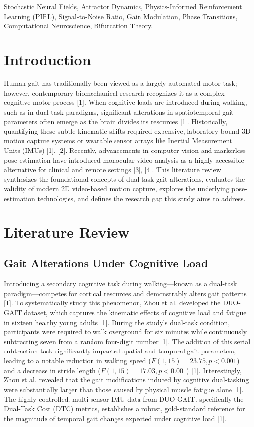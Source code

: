 \documentclass[conference]{IEEEtran}
\begin{document}
\begin{IEEEkeywords}
Stochastic Neural Fields, Attractor Dynamics, Physics-Informed Reinforcement Learning (PIRL), Signal-to-Noise Ratio, Gain Modulation, Phase Transitions, Computational Neuroscience, Bifurcation Theory.
\end{IEEEkeywords}

\section{Introduction}
Human gait has traditionally been viewed as a largely automated motor task; however, contemporary biomechanical research recognizes it as a complex cognitive-motor process [1]. When cognitive loads are introduced during walking, such as in dual-task paradigms, significant alterations in spatiotemporal gait parameters often emerge as the brain divides its resources [1]. Historically, quantifying these subtle kinematic shifts required expensive, laboratory-bound 3D motion capture systems or wearable sensor arrays like Inertial Measurement Units (IMUs) [1], [2]. Recently, advancements in computer vision and markerless pose estimation have introduced monocular video analysis as a highly accessible alternative for clinical and remote settings [3], [4]. This literature review synthesizes the foundational concepts of dual-task gait alterations, evaluates the validity of modern 2D video-based motion capture, explores the underlying pose-estimation technologies, and defines the research gap this study aims to address.

\section{Literature Review}
\subsection{Gait Alterations Under Cognitive Load}
Introducing a secondary cognitive task during walking—known as a dual-task paradigm—competes for cortical resources and demonstrably alters gait patterns [1]. To systematically study this phenomenon, Zhou et al. developed the DUO-GAIT dataset, which captures the kinematic effects of cognitive load and fatigue in sixteen healthy young adults [1]. During the study's dual-task condition, participants were required to walk overground for six minutes while continuously subtracting seven from a random four-digit number [1]. The addition of this serial subtraction task significantly impacted spatial and temporal gait parameters, leading to a notable reduction in walking speed ($F(1,15) = 23.75, p < 0.001$) and a decrease in stride length ($F(1,15) = 17.03, p < 0.001$) [1]. Interestingly, Zhou et al. revealed that the gait modifications induced by cognitive dual-tasking were substantially larger than those caused by physical muscle fatigue alone [1]. The highly controlled, multi-sensor IMU data from DUO-GAIT, specifically the Dual-Task Cost (DTC) metrics, establishes a robust, gold-standard reference for the magnitude of temporal gait changes expected under cognitive load [1].
\end{document}
